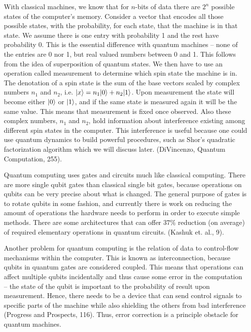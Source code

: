 \documentclass[11pt]{article}
\DeclarePairedDelimiter\qb{\lvert}{\rangle}
\begin{document}
  With classical machines, we know that for $n$-bits of data there are $2^n$ possible
  states of the computer's memory. Consider a vector that encodes all those possible
  states, with the probability, for each state, that the machine is in that state.
  We assume there is one entry with probability 1 and the rest have probability 0.
  This is the essential difference with quantum machines -- none of the entries are 0 nor 1, but real valued numbers between 0 and 1.
  This follows from the idea of superposition of quantum states.
  We then have to use an operation called measurement to determine which spin state the machine is in.
  The denotation of a spin state is the sum of the base vectors scaled by complex numbers
   $n_1$ and $n_2$, i.e. $\qb{x} = n_1\qb{0} + n_2\qb{1}$. 
  Upon measurement the state will become either $\qb{0}$ or $\qb{1}$, and if the same state is measured again it will be the same value. This means that measurement is fixed once observed. Also these complex numbers, $n_1$ and $n_2$, hold information about interference
  existing among different spin states in the computer.
  This interference is useful because one could use quantum dynamics to build powerful procedures, such as Shor's quadratic factorization algorithm which we will discuss later. (DiVincenzo, Quantum Computation, 255).


  Quantum computing uses gates and circuits much like classical computing.
  There are more single qubit gates than classical single bit gates, because operations
  on qubits can be very precise about what is changed.
  The general purpose of gates is to rotate qubits in some fashion, and currently there
  is work on reducing the amount of operations the hardware needs to perform in order to
  execute simple methods.
  There are some architectures that can offer $37\%$ reduction (on average) of
  required elementary operations in quantum circuits. (Kashuk et. al., 9).

  Another problem for quantum computing is the relation of data to control-flow
  mechanisms within the computer.
  This is known as interconnection, because qubits in quantum gates are considered coupled.
This means that operations can affect multiple qubits incidentally and thus cause some
error in the computation -- the state of the qubit is important to the probability of
result upon measurement. 
 Hence, there needs to be a device that can send control signals to specific parts of the machine while also shielding the others from bad interference (Progress and Prospects, 116). Thus, error correction is a principle obstacle for quantum machines.
\end{document}
